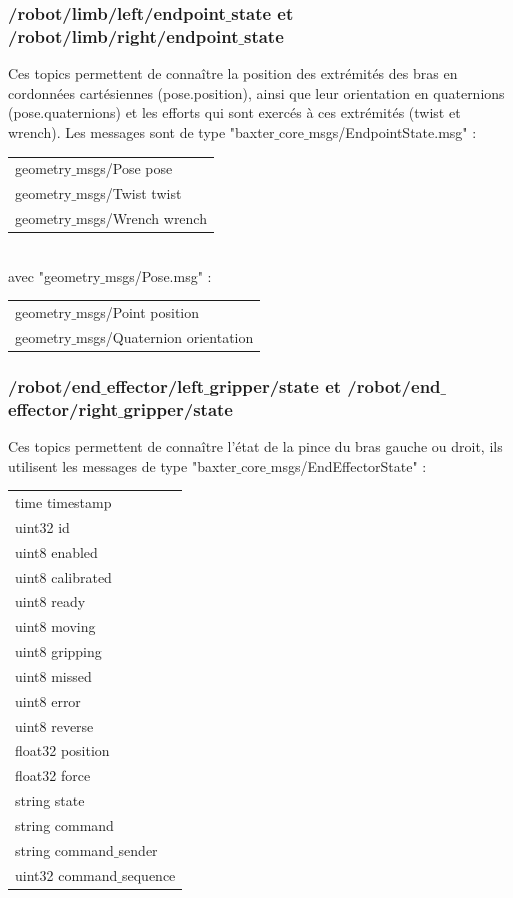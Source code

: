 \documentclass[a4paper,french, titlepage]{book}
\begin{document}
\subsubsection{/robot/limb/left/endpoint$\_$state et /robot/limb/right/endpoint$\_$state}

Ces topics permettent de connaître la position des extrémités des bras en cordonnées cartésiennes (pose.position), ainsi que leur orientation en quaternions (pose.quaternions) et les efforts qui sont exercés à ces extrémités (twist et wrench). Les messages sont de type "baxter$\_$core$\_$msgs/EndpointState.msg" :\\

\begin{tabular}{l}
geometry$\_$msgs/Pose   pose\\
geometry$\_$msgs/Twist  twist\\
geometry$\_$msgs/Wrench wrench\\
\end{tabular}\\

avec "geometry$\_$msgs/Pose.msg" :\\

\begin{tabular}{l}
geometry$\_$msgs/Point position\\
geometry$\_$msgs/Quaternion orientation\\
\end{tabular}

\subsubsection{/robot/end$\_$effector/left$\_$gripper/state et /robot/end$\_$effector/right$\_$gripper/state}

Ces topics permettent de connaître l'état de la pince du bras gauche ou droit, ils utilisent les messages de type "baxter$\_$core$\_$msgs/EndEffectorState" :\\

\begin{tabular}{l}
time timestamp\\
uint32 id \\
uint8 enabled\\
uint8 calibrated\\
uint8 ready\\
uint8 moving\\
uint8 gripping\\
uint8 missed\\
uint8 error\\
uint8 reverse\\
float32 position\\
float32 force\\
string state\\
string command\\
string command$\_$sender\\
uint32 command$\_$sequence\\
\end{tabular}\\
\end{document}
